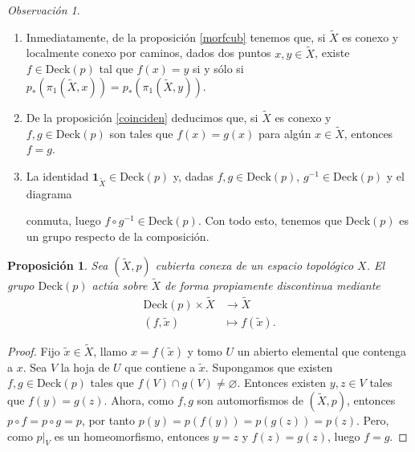\documentclass[12pt,a4paper]{book}
\newtheorem{prop}[thm]{Proposición}
\theoremstyle{definition} \newtheorem{defn}[thm]{Definición}
\theoremstyle{definition} \newtheorem{ejemplo}[thm]{Ejemplo}
\theoremstyle{definition} \newtheorem{ejercicio}[thm]{Ejercicio}
\theoremstyle{remark} \newtheorem*{obs}{Observación}
\def\id{\mathbf{1}}
\def\gf{\pi_1}
\def\XX{\tilde{X}}
\def\xx{\tilde{x}}
\def\DD{\mathrm{Deck}}
\begin{document}
\begin{obs}\leavevmode
  \begin{enumerate}
    \item Inmediatamente, de la proposición \ref{morfcub} tenemos que, si $\XX$ es conexo y localmente conexo por caminos, dados dos puntos $x,y\in \XX$, existe $f\in \DD(p)$ tal que $f(x)=y$ si y sólo si $p_{*}(\gf(\XX,x))=p_{*}(\gf(\XX,y))$.
   \item De la proposición \ref{coinciden} deducimos que, si $\XX$ es conexo y $f,g\in \DD(p)$ son tales que $f(x)=g(x)$ para algún $x\in\XX$, entonces $f=g$. 
   \item La identidad $\id_{\XX}\in \DD(p)$ y, dadas $f,g\in \DD(p)$, $g^{-1}\in \DD(p)$ y el diagrama
     \begin{center}
     \end{center}
     conmuta, luego $f\circ g^{-1} \in \DD(p)$. Con todo esto, tenemos que $\DD(p)$ es un grupo respecto de la composición.
 \end{enumerate}
\end{obs}

\begin{prop}
  Sea $(\XX,p)$ cubierta conexa de un espacio topológico $X$. El grupo $\DD(p)$ actúa sobre $\XX$ de forma propiamente discontinua mediante
  \begin{align*}
     \DD(p) \times \XX&\longrightarrow \XX\\ 
      (f,\xx) &\longmapsto f(\xx). 
    \end{align*}
\end{prop}
\begin{proof}
  Fijo $\xx \in \XX$, llamo $x=f(\xx)$ y tomo $U$ un abierto elemental que contenga a $x$. Sea $V$ la hoja de $U$ que contiene a $\xx$. Supongamos que existen $f,g\in\DD(p)$ tales que $f(V)\cap g(V)\neq \varnothing$. Entonces existen $y,z\in V$ tales que $f(y)=g(z)$. Ahora, como $f,g$ son automorfismos de $(\XX,p)$, entonces $p\circ f=p\circ g=p$, por tanto $p(y)=p(f(y))=p(g(z))=p(z)$. Pero, como $p|_{V}$ es un homeomorfismo, entonces $y=z$ y $f(z)=g(z)$, luego $f=g$. 
\end{proof}
\end{document}
